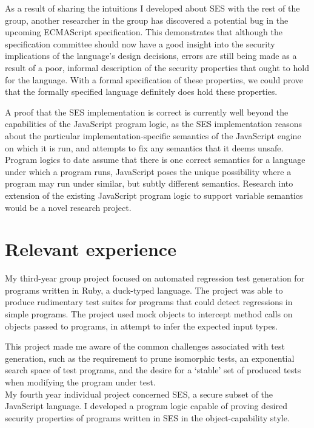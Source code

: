 \documentclass[a4paper]{article}
\begin{document}
As a result of sharing the intuitions I developed about SES with the rest of the
group, another researcher in the group has discovered a potential bug in the
upcoming ECMAScript specification. This demonstrates that although the
specification committee should now have a good insight into the security
implications of the language's design decisions, errors are still being made as
a result of a poor, informal description of the security properties that ought
to hold for the language. With a formal specification of these properties, we
could prove that the formally specified language definitely does hold these
properties.

A proof that the SES implementation is correct is currently well beyond the
capabilities of the JavaScript program logic, as the SES implementation reasons
about the particular implementation-specific semantics of the JavaScript engine
on which it is run, and attempts to fix any semantics that it deems unsafe.
Program logics to date assume that there is one correct semantics for a language
under which a program runs, JavaScript poses the unique possibility where a
program may run under similar, but subtly different semantics. Research into
extension of the existing JavaScript program logic to support variable semantics
would be a novel research project.

\section{Relevant experience}
My third-year group project focused on automated regression test generation for
programs written in Ruby, a duck-typed language. The project was able to produce
rudimentary test suites for programs that could detect regressions in simple
programs. The project used mock objects to intercept method calls on objects
passed to programs, in attempt to infer the expected input types.

This project made me aware of the common challenges associated with test
generation, such as the requirement to prune isomorphic tests, an exponential
search space of test programs, and the desire for a `stable' set of produced
tests when modifying the program under test.
\\

My fourth year individual project concerned SES, a secure subset of the
JavaScript language. I developed a program logic capable of proving desired
security properties of programs
written in SES in the object-capability style.
\end{document}
